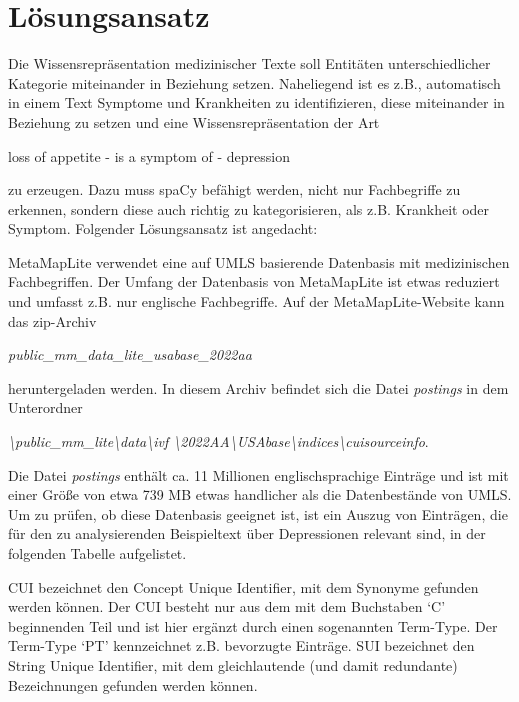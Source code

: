 \chapter{Lösungsansatz}

Die Wissensrepräsentation medizinischer Texte soll Entitäten unterschiedlicher Kategorie miteinander in Beziehung setzen. Naheliegend ist es z.B., automatisch in einem Text Symptome und Krankheiten zu identifizieren, diese miteinander in Beziehung zu setzen und eine Wissensrepräsentation der Art

\begin{center}
loss of appetite - is a symptom of - depression
\end{center}

zu erzeugen. Dazu muss spaCy befähigt werden, nicht nur Fachbegriffe zu erkennen, sondern diese auch richtig zu kategorisieren, als z.B. Krankheit oder Symptom. Folgender Lösungsansatz ist angedacht:

MetaMapLite verwendet eine auf UMLS basierende Datenbasis mit medizinischen Fachbegriffen. Der Umfang der Datenbasis von MetaMapLite ist etwas reduziert und umfasst z.B. nur englische Fachbegriffe. Auf der MetaMapLite-Website kann das zip-Archiv

\begin{center}
\emph{public\_mm\_data\_lite\_usabase\_2022aa}
\end{center}

heruntergeladen werden. In diesem Archiv befindet sich die Datei \emph{postings} in dem Unterordner

\begin{center}
\emph{\textbackslash public\_mm\_lite\textbackslash data\textbackslash ivf \textbackslash 2022AA\textbackslash USAbase\textbackslash indices\textbackslash cuisourceinfo}.
\end{center}

Die Datei \emph{postings} enthält ca. 11 Millionen englischsprachige Einträge und ist mit einer Größe von etwa 739 MB etwas handlicher als die Datenbestände von UMLS. Um zu prüfen, ob diese Datenbasis geeignet ist, ist ein Auszug von Einträgen, die für den zu analysierenden Beispieltext über Depressionen relevant sind, in der folgenden Tabelle aufgelistet.

CUI bezeichnet den Concept Unique Identifier, mit dem Synonyme gefunden werden können. Der CUI besteht nur aus dem mit dem Buchstaben `C' beginnenden Teil und ist hier ergänzt durch einen sogenannten Term-Type. Der Term-Type `PT' kennzeichnet z.B. bevorzugte Einträge. SUI bezeichnet den String Unique Identifier, mit dem gleichlautende (und damit redundante) Bezeichnungen gefunden werden können.

